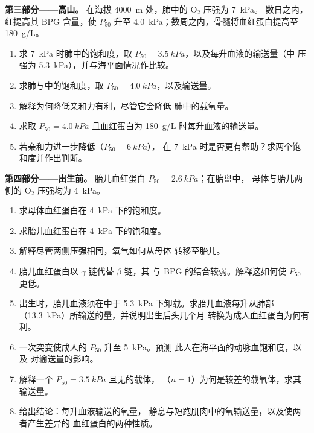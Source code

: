 \begin{problem}
\medskip
\noindent\textbf{第三部分——高山。}
在海拔 \qty{4000}{m} 处，肺中的 $\mathrm{O_2}$ 压强为 \qty{7}{kPa}。
数日之内，红提高其 BPG 含量，使 $P_{50}$ 升至
\qty{4.0}{kPa}；数周之内，骨髓将血红蛋白提高至
\qty{180}{g/L}。
\begin{enumerate}[resume]
  \item 求 \qty{7}{kPa} 时肺中的饱和度，取
        $P_{50} = \qty{3.5}{kPa}$，以及每升血液的输送量（中
        压强为 \qty{5.3}{kPa}），并与海平面情况作比较。
  \item 求肺与中的饱和度，取
        $P_{50} = \qty{4.0}{kPa}$，以及输送量。
  \item 解释为何降低亲和力有利，尽管它会降低
        肺中的载氧量。
  \item 求取 $P_{50} = \qty{4.0}{kPa}$ 且血红蛋白为
        \qty{180}{g/L} 时每升血液的输送量。
  \item 若亲和力进一步降低（$P_{50} = \qty{6}{kPa}$），
        在 \qty{7}{kPa} 时是否更有帮助？求两个饱和度并作出判断。
\end{enumerate}

\medskip
\noindent\textbf{第四部分——出生前。}
胎儿血红蛋白 $P_{50} = \qty{2.6}{kPa}$；在胎盘中，
母体与胎儿两侧的 $\mathrm{O_2}$ 压强均为 \qty{4}{kPa}。
\begin{enumerate}[resume]
  \item 求母体血红蛋白在 \qty{4}{kPa} 下的饱和度。
  \item 求胎儿血红蛋白在 \qty{4}{kPa} 下的饱和度。
  \item 解释尽管两侧压强相同，氧气如何从母体
        转移至胎儿。
  \item 胎儿血红蛋白以 $\gamma$ 链代替 $\beta$ 链，其
        与 BPG 的结合较弱。解释这如何使 $P_{50}$ 更低。
  \item 出生时，胎儿血液须在中于
        \qty{5.3}{kPa} 下卸载。求胎儿血液每升从肺部
        （\qty{13.3}{kPa}）所输送的量，并说明出生后头几个月
        转换为成人血红蛋白为何有利。
  \item 一次突变使成人的 $P_{50}$ 升至 \qty{5}{kPa}。预测
        此人在海平面的动脉血饱和度，以及
        对输送量的影响。
  \item 解释一个 $P_{50} = \qty{3.5}{kPa}$ 且无的载体，
        （$n = 1$）为何是较差的载氧体，求其
        输送量。
  \item 给出结论：每升血液输送的氧量，
        静息与短跑肌肉中的氧输送量，以及使两者产生差异的
        血红蛋白的两种性质。
\end{enumerate}
\end{problem}
